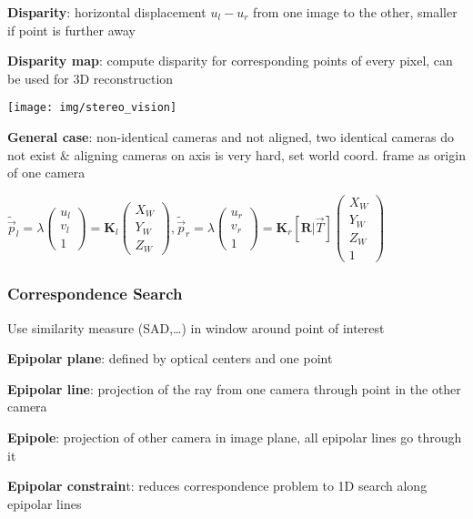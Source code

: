 \documentclass[fontsize=6pt]{scrartcl}
\newcommand{\mat}[1]{\mathbf{#1}}
\begin{document}
\begin{multicols*}{4}
\begin{minipage}{0.6\linewidth}
	\textbf{Disparity}: horizontal displacement $u_l - u_r$ from one image to the other, smaller if point is further away

	\textbf{Disparity map}: compute disparity for corresponding points of every pixel, can be used for 3D reconstruction
\end{minipage}
\begin{minipage}{0.4\linewidth}
	\texttt{[image: img/stereo\_vision]}
\end{minipage}

\textbf{General case}: non-identical cameras and not aligned, two identical cameras do not exist \& aligning cameras on axis is very hard, set world coord. frame as origin of one camera

$
\tilde{\vec p}_l = \lambda
\left(
\begin{smallmatrix}
u_l\\
v_l\\
1
\end{smallmatrix}
\right)
= \mat K_l
\left(
\begin{smallmatrix}
X_W\\
Y_W\\
Z_W
\end{smallmatrix}
\right)
,
\tilde{\vec p}_r = \lambda
\left(
\begin{smallmatrix}
u_r\\
v_r\\
1
\end{smallmatrix}
\right)
= \mat K_r
\left[\mat R | \vec T\right]
\left(
\begin{smallmatrix}
X_W\\
Y_W\\
Z_W\\
1
\end{smallmatrix}
\right)
$

\subsubsection*{Correspondence Search}
Use similarity measure (SAD,…) in window around point of interest

\textbf{Epipolar plane}: defined by optical centers and one point

\textbf{Epipolar line}: projection of the ray from one camera through point in the other camera

\textbf{Epipole}: projection of other camera in image plane, all epipolar lines go through it

\textbf{Epipolar constrain}t: reduces correspondence problem to 1D search along epipolar lines


\end{multicols*}
\end{document}
